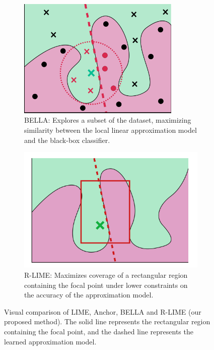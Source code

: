 \documentclass[runningheads]{llncs}
\begin{document}
\begin{figure}[tb]
\begin{subfigure}[t]{0.45\textwidth}
    \centering
    \includegraphics[width=0.85\textwidth]{bella}
    \caption{%
      BELLA: Explores a subset of the dataset, maximizing similarity between the local linear approximation model and the black-box classifier.}\label{fig:bella}
  \end{subfigure}
  \hfill
  \begin{subfigure}[t]{0.45\textwidth}
    \centering
    \includegraphics[width=\textwidth]{rlime3}
    \caption{%
      R-LIME: Maximizes coverage of a rectangular region containing the focal point under lower constraints on the accuracy of the approximation model.}\label{fig:rlime}
  \end{subfigure}
  \caption{%
    Visual comparison of LIME, Anchor, BELLA and R-LIME (our proposed method).
    The solid line represents the rectangular region containing the focal
    point, and the dashed line represents the learned approximation model.
  }
\end{figure}
\end{document}
